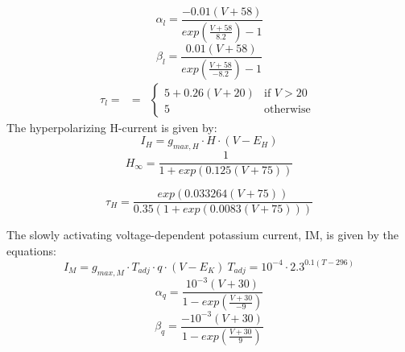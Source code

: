 \documentclass[12pt]{article}
\begin{document}
\begin{equation}
\alpha_{l} = \frac{-0.01(V + 58)}{exp( \frac{V + 58}{8.2}) - 1}
\end{equation}
\newline
\begin{equation}
\beta_{l} = \frac{0.01(V + 58)}{exp( \frac{V + 58}{-8.2}) - 1}
\end{equation}
\newline
\begin{equation}
	\begin{matrix}
	\tau_{l} = & =
	& \left\{
	\begin{matrix}
	 5 + 0.26(V + 20) & \mbox{if } V > 20 \\
	 5 & \mbox{otherwise }
	\end{matrix} \right.
	\end{matrix}
\end{equation}
\newline
The hyperpolarizing H-current is given by:
\begin{equation}
I_{H} = g_{max, H} \cdot H \cdot (V - E_{H})
\end{equation}
\begin{equation}
H_{\infty} = \frac{1}{1 + exp(0.125(V + 75))} 
\end{equation}

\begin{equation}
\tau_H = \frac{exp(0.033264 (V + 75))}{0.35(1 + exp(0.0083(V + 75)))}
\end{equation}
\newline

The slowly activating voltage-dependent potassium current, IM, is  given by the equations:
\begin{equation}
I_M = g_{max, M} \cdot T_{adj} \cdot q \cdot (V - E_{K}) \ 
T_{adj} = 10^{-4} \cdot 2.3^{0.1(T - 296)}
\end{equation}
\begin{equation}
\alpha_{q} = \frac{10^{-3}(V+30)}{1-exp(\frac{V+30}{-9})}
\end{equation}
\begin{equation}
\beta_{q} = \frac{-10^{-3}(V+30)}{1-exp(\frac{V+30}{9})}
\end{equation}
\newline
\end{document}
